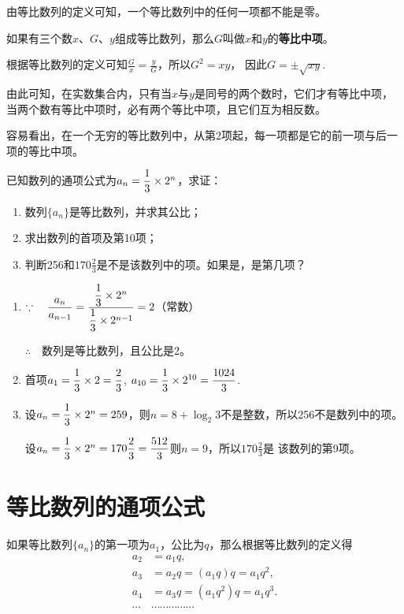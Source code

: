 由等比数列的定义可知，一个等比数列中的任何一项都不能是零。

如果有三个数$x$、$G$、$y$组成等比数列，那么$G$叫做$x$和$y$的\textbf{等比中项}。

根据等比数列的定义可知$\frac{G}{x}=\frac{y}{G}$，所以$G^2=xy$，
因此$G=\pm\sqrt{xy}$.

由此可知，在实数集合内，只有当$x$与$y$是同号的两个数时，它们才有等比中项，当两个数有等比中项时，必有两个等比中项，且它们互为相反数。

容易看出，在一个无穷的等比数列中，从第2项起，每一项都是它的前一项与后一项的等比中项。


\begin{example}
已知数列的通项公式为$a_n=\dfrac{1}{3}\times 2^n$，求证：
\begin{enumerate}[(1)]
\item 数列$\{a_n\}$是等比数列，并求其公比；
\item 求出数列的首项及第10项；
\item 判断256和$170\frac{2}{3}$是不是该数列中的项。如果是，是第几项？
\end{enumerate}
\end{example}

\begin{solution}
\begin{enumerate}[(1)]
    \item $\because\quad \dfrac{a_n}{a_{n-1}}=\dfrac{\dfrac{1}{3}\times 2^n}{\dfrac{1}{3}\times 2^{n-1}}=2$（常数）
    
$\therefore\quad $数列是等比数列，且公比是2。
\item 首项$a_1=\dfrac{1}{3}\times2=\dfrac{2}{3}$, $a_{10}=\dfrac{1}{3}\times2^{10}=\dfrac{1024}{3}$.
\item 设$a_n=\dfrac{1}{3}\times2^n=259$，则$n=8+\log_2 3$不是整数，所以256不是数列中的项。

设$a_n=\dfrac{1}{3}\times2^n=170\dfrac{2}{3}=\dfrac{512}{3}$则$n=9$，所以$170\frac{2}{3}$是
该数列的第9项。
\end{enumerate}
\end{solution}


\section{等比数列的通项公式}
如果等比数列$\{a_n\}$的第一项为$a_1$，公比为$q$，那么根据等比数列的定义得
\[\begin{split}
  a_2&=a_1q,\\
a_3&=a_2q=(a_1q)q=a_1q^2,\\
a_4&=a_3q=(a_1q^2)q=a_1q^3.\\  
\cdots &\cdots \cdots \cdots \cdots \cdots 
\end{split}\]

